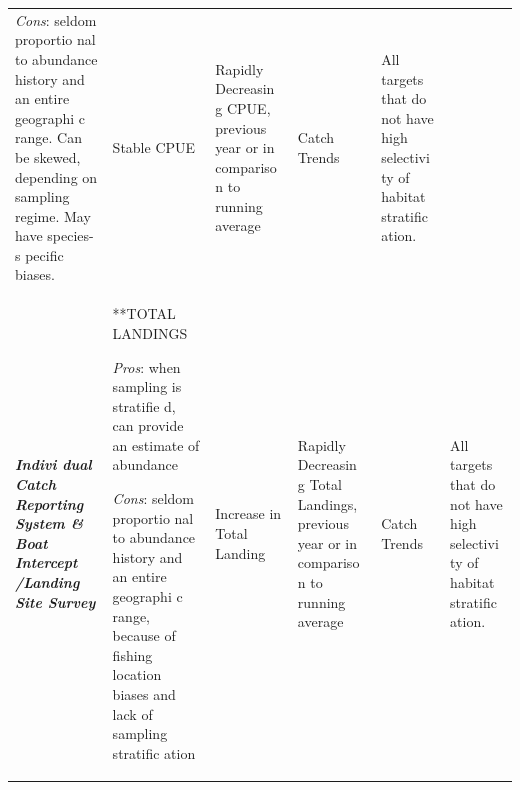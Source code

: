 \documentclass[]{book}
\begin{document}
\begin{longtable}[]{@{}llllll@{}}
\begin{minipage}[t]{0.16\columnwidth}
\emph{Cons}: seldom proportio nal to abundance history and an entire
geographi c range. Can be skewed, depending on sampling regime. May have
species-s pecific biases.\strut
\end{minipage} & \begin{minipage}[t]{0.16\columnwidth}\raggedright\strut
Stable CPUE\strut
\end{minipage} & \begin{minipage}[t]{0.16\columnwidth}\raggedright\strut
Rapidly Decreasin g CPUE, previous year or in compariso n to running
average\strut
\end{minipage} & \begin{minipage}[t]{0.16\columnwidth}\raggedright\strut
Catch Trends\strut
\end{minipage} & \begin{minipage}[t]{0.16\columnwidth}\raggedright\strut
All targets that do not have high selectivi ty of habitat stratific
ation.\strut
\end{minipage}\tabularnewline
\begin{minipage}[t]{0.16\columnwidth}\raggedright\strut
\textbf{\emph{Indivi dual Catch Reporting System \& Boat Intercept
/Landing Site Survey}}\strut
\end{minipage} & \begin{minipage}[t]{0.16\columnwidth}\raggedright\strut
**TOTAL LANDINGS\emph{ }

\emph{Pros}: when sampling is stratifie d, can provide an estimate of
abundance

\emph{Cons}: seldom proportio nal to abundance history and an entire
geographi c range, because of fishing location biases and lack of
sampling stratific ation\strut
\end{minipage} & \begin{minipage}[t]{0.16\columnwidth}\raggedright\strut
Increase in Total Landing\strut
\end{minipage} & \begin{minipage}[t]{0.16\columnwidth}\raggedright\strut
Rapidly Decreasin g Total Landings, previous year or in compariso n to
running average\strut
\end{minipage} & \begin{minipage}[t]{0.16\columnwidth}\raggedright\strut
Catch Trends\strut
\end{minipage} & \begin{minipage}[t]{0.16\columnwidth}\raggedright\strut
All targets that do not have high selectivi ty of habitat stratific
ation.\strut
\end{minipage}\tabularnewline
\bottomrule
\end{longtable}
\end{document}
